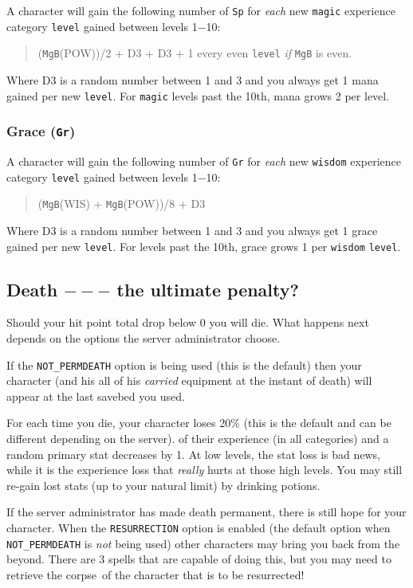 A character will gain the following number of {\tt Sp} for {\em each} new
{\tt magic} experience category {\tt level} gained between levels 1$-$10:
\begin{quote}
({\tt MgB}(POW))/2 + D3 + D3 + 1 every even {\tt level} {\em if} {\tt MgB} is even.
\end{quote}
Where D3 is a random number between 1 and 3 and you always get 1 mana gained
per new {\tt level}. For {\tt magic} levels past the 10th, mana grows 2 per level.
 

\subsubsection{Grace ({\tt Gr})} 

A character will gain the following number of {\tt Gr} for {\em each} new
{\tt wisdom} experience category {\tt level} gained between levels 1$-$10:
\begin{quote}
({\tt MgB}(WIS) + {\tt MgB}(POW))/8 + D3
\end{quote}
Where D3 is a random number between 1 and 3 and you always get 1 grace gained
per new {\tt level}. For levels past the 10th, 
grace grows 1 per {\tt wisdom} {\tt level}.

\subsection{Death $---$ the ultimate penalty?}\label{sec:death}

Should your hit point total drop below 0 you will die. 
What happens next depends on the options the server administrator choose.

If the {\tt NOT\_PERMDEATH} option is being used (this is the default) then your character
 (and his all of his {\em carried}
equipment at the instant of death) will appear at the last savebed you used.

For each time you die, your character loses 20\% (this is the default and can be different 
depending on the server).
of their experience (in all categories) and a random primary stat decreases by 1. 
At low levels, the stat loss is bad news, while it is the experience loss that
{\em really} hurts at those high levels. You may still re-gain lost stats (up to your
natural limit) by drinking potions.

If the server administrator has made death permanent, there is still hope
for your character. When the {\tt RESURRECTION} option is enabled (the default option
when {\tt NOT\_PERMDEATH} is {\em not} being used) other characters may bring you back
from the beyond. There are 3 spells that are capable of doing this, but
you may need to retrieve the corpse\ of the character 
that is to be resurrected!


